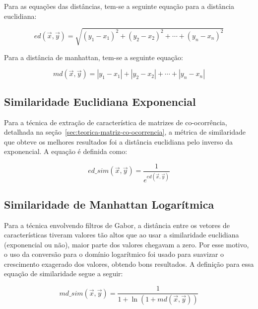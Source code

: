 Para as equações das distâncias, tem-se a seguinte equação para a
distância euclidiana:

\begin{equation}\label{eq:euclidian-distance}
ed(\vec{x}, \vec{y}) = \sqrt{{(y_1-x_1)}^2 + {(y_2-x_2)}^2 + \cdots + {(y_n-x_n)}^2}
\end{equation}

Para a distância de manhattan, tem-se a seguinte equação:

\begin{equation}\label{eq:manhattan-distance}
md(\vec{x}, \vec{y}) = |y_1-x_1| + |y_2-x_2| + \cdots + |y_n-x_n|
\end{equation}

\subsection{Similaridade Euclidiana Exponencial}\label{sec:teorica-similaridade-euclidiana}

Para a técnica de extração de característica de matrizes de co-ocorrência,
detalhada na seção~\ref{sec:teorica-matriz-co-ocorrencia}, a métrica de
similaridade que obteve os melhores resultados foi a distância
euclidiana pelo inverso da exponencial. A equação é definida como:

\begin{equation}\label{eq:euclidian-similarity}
  ed\_sim(\vec{x}, \vec{y}) = \dfrac{1}{e^{ed(\vec{x}, \vec{y})}}
\end{equation}

\subsection{Similaridade de Manhattan Logarítmica}\label{sec:teorica-similaridade-manhattan}

Para a técnica envolvendo filtros de Gabor, a distância entre os
vetores de características tiveram valores tão altos que ao usar a
similaridade euclidiana (exponencial ou não), maior parte dos valores
chegavam a zero. Por esse motivo, o uso da conversão para o domínio
logarítmico foi usado para suavizar o crescimento exagerado dos
valores, obtendo bons resultados. A definição para essa equação de
similaridade segue a seguir:

\begin{equation}\label{eq:manhattan-similarity}
  md\_sim(\vec{x}, \vec{y}) = \dfrac{1}{1 + \ln(1 + md(\vec{x}, \vec{y}))}
\end{equation}

